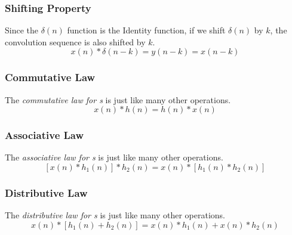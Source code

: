 \subsubsection{Shifting Property}\label{subsubsec:Convolution_Property-Shifting}
\begin{definition}\label{def:Linear_Convolution_Property-Shifting}
  Since the $\delta(n)$ function is the Identity function, if we shift $\delta(n)$ by $k$, the convolution sequence is also shifted by $k$.
  \begin{equation}\label{eq:Convolution_Property-Shifting}
    x(n) * \delta(n-k) = y(n-k) = x(n-k)
  \end{equation}
\end{definition}

\subsubsection{Commutative Law}\label{subsubsec:Convolution_Property-Commutative}
\begin{definition}\label{def:Linear_Convolution_Property-Commutative}
  The \emph{commutative law for s} is just like many other operations.
  \begin{equation}\label{eq:Convolution_Property-Commutative}
    x(n) * h(n) = h(n) * x(n)
  \end{equation}
\end{definition}

\subsubsection{Associative Law}\label{subsubsec:Convolution_Property-Associative}
\begin{definition}\label{def:Linear_Convolution_Property-Associative}
  The \emph{associative law for s} is just like many other operations.
  \begin{equation}\label{eq:Convolution_Property-Associative}
    \left[ x(n) * h_{1}(n) \right] * h_{2}(n) = x(n) * \left[ h_{1}(n) * h_{2}(n) \right]
  \end{equation}
\end{definition}

\subsubsection{Distributive Law}\label{subsubsec:Convolution_Property-Distributive}
\begin{definition}\label{def:Linear_Convolution_Property-Distributive}
  The \emph{distributive law for s} is just like many other operations.
  \begin{equation}\label{eq:Convolution_Property-Distributive}
    x(n) * \left[ h_{1}(n) + h_{2}(n) \right] = x(n) * h_{1}(n) + x(n) * h_{2}(n)
  \end{equation}
\end{definition}

